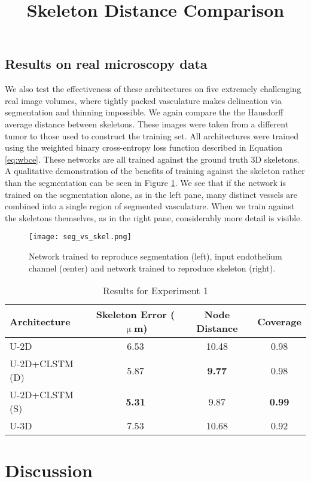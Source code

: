 \documentclass[journal,transmag]{IEEEtran}
\begin{document}
\subsection{Results on real microscopy data}

We also test the effectiveness of these architectures on five extremely challenging real image volumes, where tightly packed vasculature makes delineation via segmentation and thinning impossible. We again compare the the Hausdorff average distance between skeletons. These images were taken from a different tumor to those used to construct the training set. All architectures were trained using the weighted binary cross-entropy loss function described in Equation \ref{eq:wbce}. These networks are all trained against the ground truth 3D skeletons. A qualitative demonstration of the benefits of training against the skeleton rather than the segmentation can be seen in Figure \ref{fig:seg_skel_compare}. We see that if the network is trained on the segmentation alone, as in the left pane, many distinct vessels are combined into a single region of segmented vasculature. When we train against the skeletons themselves, as in the right pane, considerably more detail is visible.

\begin{figure}
\centering
\texttt{[image: seg\_vs\_skel.png]}
\caption{Network trained to reproduce segmentation (left), input endothelium channel (center) and network trained to reproduce skeleton (right).}
\label{fig:seg_skel_compare}
\end{figure}


\begin{table}[h]
\title{Skeleton Distance Comparison}
\centering
\begin{tabular}{l|c|c|c}
Architecture & Skeleton Error ($\upmu$m) & Node Distance & Coverage\\
\hline
U-2D & 6.53 & 10.48 & 0.98 \\
U-2D+CLSTM (D) & 5.87 & \textbf{9.77} & 0.98 \\
U-2D+CLSTM (S) & \textbf{5.31} & 9.87 & \textbf{0.99} \\
U-3D &  7.53 & 10.68 &  0.92 \\
\end{tabular}
\caption{Results for Experiment 1}
\end{table}



\section{Discussion}
\end{document}
